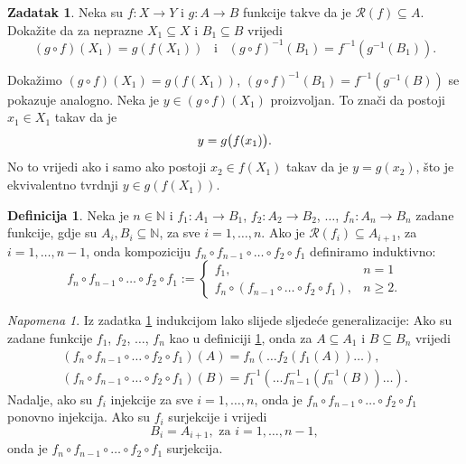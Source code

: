 \documentclass{book}
\let\originalleft\left
\let\originalright\right
\renewcommand{\left}{\mathopen{}\mathclose\bgroup\originalleft}
\renewcommand{\right}{\aftergroup\egroup\originalright}
\renewenvironment{proof}{%
    \vspace{-\parskip}\begin{oldproof}%
    }{%
    \end{oldproof}%
}
\theoremstyle{definition}
\theoremstyle{definition}
\newtheorem{definition}{Definicija}
\newtheorem{exercise}{Zadatak}
\theoremstyle{remark}
\newtheorem{remark}{Napomena}
\begin{document}
\begin{exercise}
\label{compim}
Neka su $f : X\to Y$ i $g : A\to B$ funkcije takve da je $\mathcal{R}(f)\subseteq A$. Dokažite da za neprazne $X_1\subseteq X$ i $B_1\subseteq B$ vrijedi $$(g\circ f)(X_1)=g(f(X_1))\;\;\;\text{i}\;\;\;(g\circ f)^{-1}(B_1)=f^{-1}(g^{-1}(B_1)).$$
\end{exercise}
\begin{proof}[Rješenje]
Dokažimo $(g\circ f)(X_1)=g(f(X_1))$, $(g\circ f)^{-1}(B_1)=f^{-1}(g^{-1}(B))$ se pokazuje analogno. Neka je $y\in (g\circ f)(X_1)$ proizvoljan. To znači da postoji $x_1\in X_1$ takav da je $$y=g\left(f(x_1)\right).$$
No to vrijedi ako i samo ako postoji $x_2\in f(X_1)$ takav da je $y=g(x_2)$, što je ekvivalentno tvrdnji $y\in g(f(X_1))$.
\end{proof}
\begin{definition}
\label{ncomp}
Neka je $n\in \mathbb{N}$ i $f_1 : A_1\to B_1$, $f_2 : A_2\to B_2$, $\dots$, $f_n : A_n\to B_n$ zadane funkcije, gdje su $A_i, B_i\subseteq \mathbb{N}$, za sve $i=1,\dots, n$. Ako je $\mathcal{R}(f_i)\subseteq A_{i+1}$, za $i=1,\dots, n-1$, onda kompoziciju $f_n\circ f_{n-1}\circ \dots \circ f_2\circ f_1$ definiramo induktivno:
$$f_n\circ f_{n-1}\circ \dots \circ f_2\circ f_1:=\begin{cases}
f_1, & n=1\\
f_n\circ (f_{n-1}\circ \dots \circ f_2\circ f_1),& n\geq 2.
\end{cases}
$$
\end{definition}
\begin{remark}
\label{ncomprem}
Iz zadatka \ref{compim} indukcijom lako slijede sljedeće generalizacije: Ako su zadane funkcije $f_1$, $f_2$, $\dots$, $f_n$ kao u definiciji \ref{ncomp}, onda za $A\subseteq A_1$ i $B\subseteq B_n$ vrijedi
\begin{gather*}
(f_n\circ f_{n-1}\circ\dots\circ f_2\circ f_1)(A)=f_n(\dots f_2(f_1(A))\dots),\\
(f_n\circ f_{n-1}\circ\dots\circ f_2\circ f_1)(B)=f_1^{-1}(\dots f_{n-1}^{-1}(f_n^{-1}(B))\dots).
\end{gather*}
Nadalje, ako su $f_i$ injekcije za sve $i=1, \dots, n$, onda je $f_n\circ f_{n-1}\circ\dots\circ f_2\circ f_1$ ponovno injekcija. Ako su $f_i$ surjekcije i vrijedi
$$B_i=A_{i+1},\text{ za }i=1,\dots, n-1,$$
onda je $f_n\circ f_{n-1}\circ\dots\circ f_2\circ f_1$ surjekcija.
\end{remark}
\end{document}
